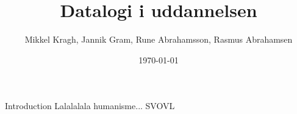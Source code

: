 \documentclass{beamer}
\title[Title]{Datalogi i uddannelsen}
\author{Mikkel Kragh, Jannik Gram, Rune Abrahamsson, Rasmus Abrahamsen}
\institute{DIKU}
\date{\today}
\begin{document}
\begin{frame}
\titlepage
\end{frame}


\begin{frame}{Introduction}
Lalalalala humanisme... SVOVL
\end{frame}
\end{document}
